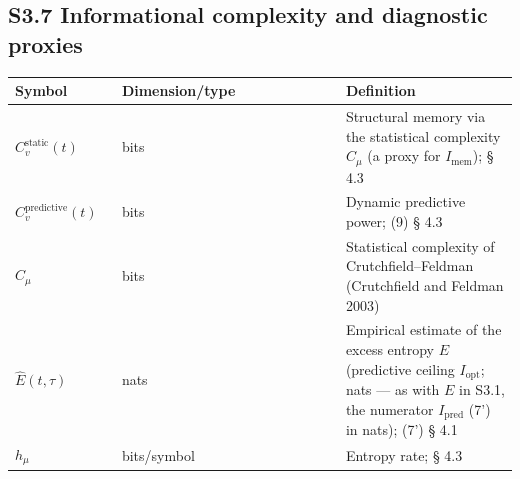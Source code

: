 \documentclass[pdflatex,sn-mathphys-ay]{sn-jnl}
\begin{document}
\subsection*{S3.7 Informational complexity and diagnostic proxies}\label{s3.7-informational-complexity-and-diagnostic-proxies}



\begin{center}\small
\begin{tabular}{@{} >{\raggedright\arraybackslash}p{0.2105\linewidth} >{\raggedright\arraybackslash}p{0.4474\linewidth} >{\raggedright\arraybackslash}p{0.3421\linewidth}@{}}
\toprule

\begin{minipage}[b]{\linewidth}\raggedright

Symbol

\end{minipage} & \begin{minipage}[b]{\linewidth}\raggedright

Dimension/type

\end{minipage} & \begin{minipage}[b]{\linewidth}\raggedright

Definition

\end{minipage} \\

\midrule

\(C_v^{\text{static}}(t)\) & bits & Structural memory via the statistical complexity \(C_\mu\) (a proxy for \(I_{\text{mem}}\)); § 4.3 \\

\(C_v^{\text{predictive}}(t)\) & bits & Dynamic predictive power; (9) § 4.3 \\

\(C_\mu\) & bits & Statistical complexity of Crutchfield--Feldman (Crutchfield and Feldman 2003) \\

\(\hat E(t, \tau)\) & nats & Empirical estimate of the excess entropy \(E\) (predictive ceiling \(I_{\text{opt}}\); nats --- as with \(E\) in S3.1, the numerator \(I_{\text{pred}}\) (7') in nats); (7') § 4.1 \\

\(h_\mu\) & bits/symbol & Entropy rate; § 4.3 \\

\bottomrule
\end{tabular}
\end{center}
\end{document}

